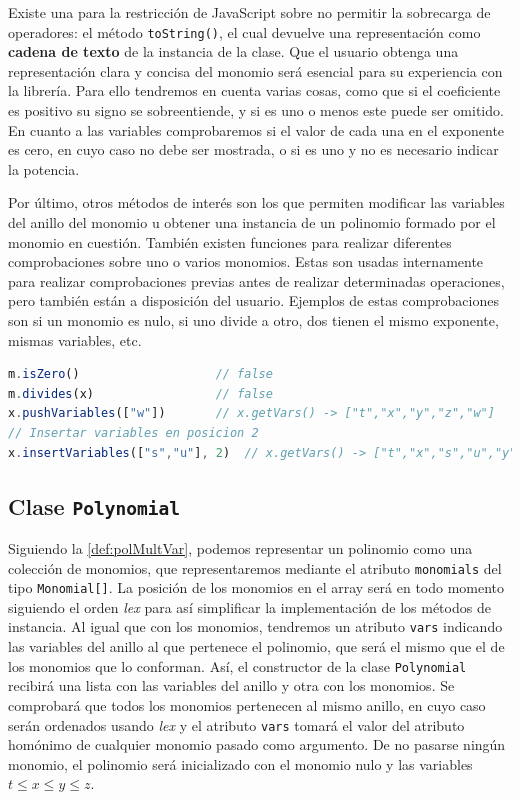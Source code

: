 Existe una para la restricción de JavaScript sobre no permitir la sobrecarga de operadores: el método \texttt{toString()}, el cual devuelve una representación como \textbf{cadena de texto} de la instancia de la clase. Que el usuario obtenga una representación clara y concisa del monomio será esencial para su experiencia con la librería. Para ello tendremos en cuenta varias cosas, como que si el coeficiente es positivo su signo se sobreentiende, y si es uno o menos este puede ser omitido. En cuanto a las variables comprobaremos si el valor de cada una en el exponente es cero, en cuyo caso no debe ser mostrada, o si es uno y no es necesario indicar la potencia.\newline

Por último, otros métodos de interés son los que permiten modificar las variables del anillo del monomio u obtener una instancia de un polinomio formado por el monomio en cuestión. También existen funciones para realizar diferentes comprobaciones sobre uno o varios monomios. Estas son usadas internamente para realizar comprobaciones previas antes de realizar determinadas operaciones, pero también están a disposición del usuario. Ejemplos de estas comprobaciones son si un monomio es nulo, si uno divide a otro, dos tienen el mismo exponente, mismas variables, etc.
\begin{lstlisting}[language=Javascript]
m.isZero()                   // false
m.divides(x)                 // false
x.pushVariables(["w"])       // x.getVars() -> ["t","x","y","z","w"]
// Insertar variables en posicion 2
x.insertVariables(["s","u"], 2)  // x.getVars() -> ["t","x","s","u","y","z","w"]
\end{lstlisting}
\subsection{Clase \texttt{Polynomial}}
Siguiendo la \autoref{def:polMultVar}, podemos representar un polinomio como una colección de monomios, que representaremos mediante el atributo \texttt{monomials} del tipo \texttt{Monomial[]}. La posición de los monomios en el array será en todo momento siguiendo el orden \textit{lex} para así simplificar la implementación de los métodos de instancia. Al igual que con los monomios, tendremos un atributo \texttt{vars} indicando las variables del anillo al que pertenece el polinomio, que será el mismo que el de los monomios que lo conforman. Así, el constructor de la clase \texttt{Polynomial} recibirá una lista con las variables del anillo y otra con los monomios. Se comprobará que todos los monomios pertenecen al mismo anillo, en cuyo caso serán ordenados usando \textit{lex} y el atributo \texttt{vars} tomará el valor del atributo homónimo de cualquier monomio pasado como argumento. De no pasarse ningún monomio, el polinomio será inicializado con el monomio nulo y las variables $t\le x\le y \le z$.\newline

